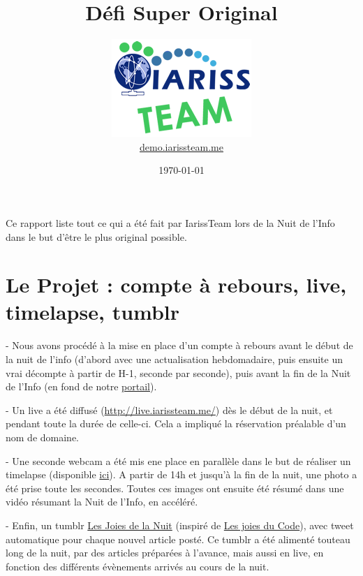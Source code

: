 \documentclass[12pt, a4paper]{article}
\title{Défi Super Original}
\newcommand{\espace}{\vspace{.8cm}}
\begin{document}
\author{\includegraphics{../_img/iariss_team.png} \\ {\sffamily \href{http://demo.iarissteam.me}{demo.iarissteam.me}}}
\date{\today}

\maketitle{}

{\sffamily Ce rapport liste tout ce qui a été fait par IarissTeam lors de la Nuit de l'Info dans le but d'être le plus original possible.} 

\espace{}
\section{Le Projet : compte à rebours, live, timelapse, tumblr}
 
- Nous avons procédé à la mise en place d'un compte à rebours avant le début de la nuit de l'info (d'abord avec une actualisation hebdomadaire, puis ensuite un vrai décompte à partir de H-1, seconde par seconde), puis avant la fin de la Nuit de l'Info (en fond de notre \href{http://iarissteam.me/}{portail}).

- Un live a été diffusé (\href{http://live.iarissteam.me/}{http://live.iarissteam.me/}) dès le début de la nuit, et pendant toute la durée de celle-ci. Cela a impliqué la réservation préalable d'un nom de domaine.

- Une seconde webcam a été mis ene place en parallèle dans le but de réaliser un timelapse (disponible \href{http://timelapse.iarissteam.me}{ici}). A partir de 14h et jusqu'à la fin de la nuit, une photo a été prise toute les secondes. Toutes ces images ont ensuite été résumé dans une vidéo résumant la Nuit de l'Info, en accéléré.

- Enfin, un tumblr \href{http://lesjoiesdelanuit.tumblr.com/}{Les Joies de la Nuit} (inspiré de \href{http://lesjoiesducode.tumblr.com/}{Les joies du Code}), avec tweet automatique pour chaque nouvel article posté. Ce tumblr a été alimenté touteau long de la nuit, par des articles préparées à l'avance, mais aussi en \og{}live\fg{}, en fonction des différents évènements arrivés au cours de la nuit.
\end{document}
